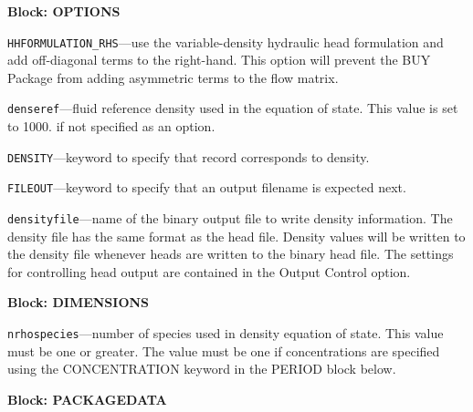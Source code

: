
\item \textbf{Block: OPTIONS}

\begin{description}
\item \texttt{HHFORMULATION\_RHS}---use the variable-density hydraulic head formulation and add off-diagonal terms to the right-hand.  This option will prevent the BUY Package from adding asymmetric terms to the flow matrix.

\item \texttt{denseref}---fluid reference density used in the equation of state.  This value is set to 1000. if not specified as an option.

\item \texttt{DENSITY}---keyword to specify that record corresponds to density.

\item \texttt{FILEOUT}---keyword to specify that an output filename is expected next.

\item \texttt{densityfile}---name of the binary output file to write density information.  The density file has the same format as the head file.  Density values will be written to the density file whenever heads are written to the binary head file.  The settings for controlling head output are contained in the Output Control option.

\end{description}
\item \textbf{Block: DIMENSIONS}

\begin{description}
\item \texttt{nrhospecies}---number of species used in density equation of state.  This value must be one or greater.  The value must be one if concentrations are specified using the CONCENTRATION keyword in the PERIOD block below.

\end{description}
\item \textbf{Block: PACKAGEDATA}

